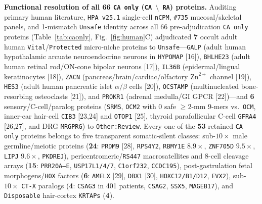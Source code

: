 \documentclass[10pt,letterpaper]{article}
\begin{document}
\textbf{Functional resolution of all 66 \texttt{CA only} (\texttt{CA $\setminus$ RA}) proteins.} Auditing primary human literature, \texttt{HPA v25.1} single-cell \texttt{nCPM}, \texttt{\#735} mucosal/skeletal panels, and 1-mismatch \texttt{Unsafe} identity across all 66 pre-adjudication \texttt{CA only} proteins (Table~\ref{tab:caonly}, Fig.~\ref{fig:human}C) adjudicated \textbf{7} occult adult human \texttt{Vital}/\texttt{Protected} micro-niche proteins to \texttt{Unsafe}---\texttt{GALP} (adult human hypothalamic arcuate neuroendocrine neurons in \texttt{HYPOMAP} [16]), \texttt{BHLHE23} (adult human retinal rod/ON-cone bipolar neurons [17]), \texttt{IL36B} (epidermal/lingual keratinocytes [18]), \texttt{ZACN} (pancreas/brain/cardiac/olfactory $\text{Zn}^{2+}$ channel [19]), \texttt{HES3} (adult human pancreatic islet $\alpha/\beta$ cells [20]), \texttt{OCSTAMP} (multinucleated bone-resorbing osteoclasts [21]), and \texttt{PROKR1} (adrenal medulla/GI GPCR [22])---and \textbf{6} sensory/C-cell/paralog proteins (\texttt{SRMS}, \texttt{OCM2} with 0 safe $\ge 2$-mm 9-mers vs.\ \texttt{OCM}, inner-ear hair-cell \texttt{CIB3} [23,24] and \texttt{OTOP1} [25], thyroid parafollicular C-cell \texttt{GFRA4} [26,27], and DRG \texttt{MRGPRG}) to \texttt{Other:Review}. Every one of the \textbf{53} retained \texttt{CA only} proteins belongs to five transparent somatic-silent classes: sub-$10\times$ male germline/meiotic proteins (\textbf{24}: \texttt{PRDM9} [28], \texttt{RPS4Y2}, \texttt{RBMY1E} $8.9\times$, \texttt{ZNF705D} $9.5\times$, \texttt{LIPJ} $9.6\times$, \texttt{PKDREJ}), pericentromeric/\texttt{RS447} macrosatellites and 8-cell cleavage arrays (\textbf{15}: \texttt{PRR20A--E}, \texttt{USP17L1/4/7}, \texttt{C1orf232}, \texttt{CCDC195}), post-gastrulation fetal morphogens/\texttt{HOX} factors (\textbf{6}: \texttt{AMELX} [29], \texttt{DBX1} [30], \texttt{HOXC12/B1/D12}, \texttt{EVX2}), sub-$10\times$ \texttt{CT-X} paralogs (\textbf{4}: \texttt{CSAG3} in 401 patients, \texttt{CSAG2}, \texttt{SSX5}, \texttt{MAGEB17}), and \texttt{Disposable} hair-cortex \texttt{KRTAPs} (\textbf{4}).
\end{document}
